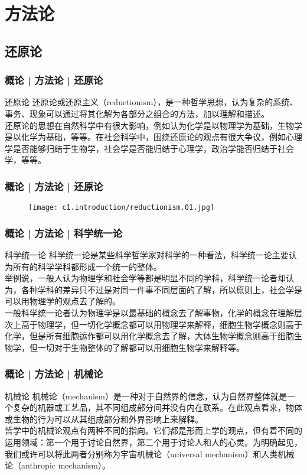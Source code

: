 \section{方法论}
\subsection{还原论}
\begin{frame}
  \frametitle{概论 | 方法论 | 还原论}
  \begin{block}{还原论}
还原论或还原主义（reductionism），是一种哲学思想，认为复杂的系统、事务、现象可以通过将其化解为各部分之组合的方法，加以理解和描述。\\
\vspace{1em}
还原论的思想在自然科学中有很大影响，例如认为化学是以物理学为基础，生物学是以化学为基础，等等。在社会科学中，围绕还原论的观点有很大争议，例如心理学是否能够归结于生物学，社会学是否能归结于心理学，政治学能否归结于社会学，等等。
  \end{block}
\end{frame}

\begin{frame}
  \frametitle{概论 | 方法论 | 还原论}
  \begin{figure}
    \centering
    \texttt{[image: c1.introduction/reductionism.01.jpg]}
  \end{figure}
\end{frame}

\begin{frame}
  \frametitle{概论 | 方法论 | 科学统一论}
  \begin{block}{科学统一论}
科学统一论是某些科学哲学家对科学的一种看法，科学统一论主要认为所有的科学学科都形成一个统一的整体。\\
\vspace{1em}
举例说，一般人认为物理学和社会学等都是明显不同的学科，科学统一论者却认为，各种学科的差异只不过是对同一件事不同层面的了解，所以原则上，社会学是可以用物理学的观点去了解的。\\
\vspace{1em}
一般科学统一论者认为物理学是以最基础的概念去了解事物，化学的概念在理解层次上高于物理学，但一切化学概念都可以用物理学来解释，细胞生物学概念则高于化学，但是所有细胞运作都可以用化学概念去了解，大体生物学概念则高于细胞生物学，但一切对于生物整体的了解都可以用细胞生物学来解释等。
  \end{block}
\end{frame}

\begin{frame}
  \frametitle{概论 | 方法论 | 机械论}
  \begin{block}{机械论}
机械论（mechanism）是一种对于自然界的信念，认为自然界整体就是一个复杂的机器或工艺品，其不同组成部分间并没有内在联系。在此观点看来，物体或生物的行为可以从其组成部分和外界影响上来解释。\\
\vspace{1em}
哲学中的机械论观点有两种不同的指向。它们都是形而上学的观点，但有着不同的运用领域：第一个用于讨论自然界，第二个用于讨论人和人的心灵。为明确起见，我们或许可以将此两者分别称为宇宙机械论（universal mechanism）和人类机械论（anthropic mechanism）。
  \end{block}
\end{frame}

